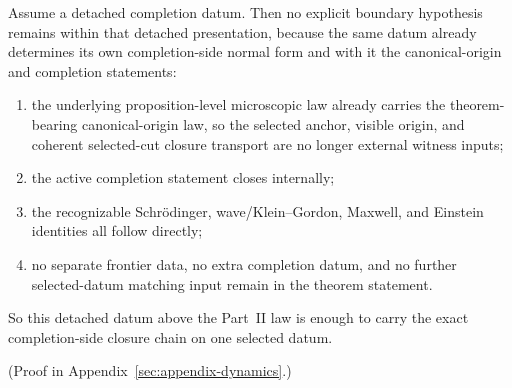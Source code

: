 \begin{theorem}
\label{thm:endpoint-complete-no-stage-law-closes-the-remaining-flagship-seam}
Assume a detached completion datum. Then no explicit boundary hypothesis
remains within that detached presentation, because the same datum already
determines its own completion-side normal form and with it the
canonical-origin and completion statements:
\begin{enumerate}
\item the underlying proposition-level microscopic law already carries the
      theorem-bearing canonical-origin law, so the selected anchor, visible
      origin, and coherent selected-cut closure transport are no longer
      external witness inputs;
\item the active completion statement closes internally;
\item the recognizable Schr\"odinger, wave/Klein--Gordon, Maxwell, and
       Einstein identities all follow directly;
\item no separate frontier data, no extra completion datum, and no further
       selected-datum matching input remain in the theorem statement.
\end{enumerate}
So this detached datum above the Part~II law is enough to carry the exact
completion-side closure chain on one selected datum.
\end{theorem}

(Proof in Appendix~\ref{sec:appendix-dynamics}.)

